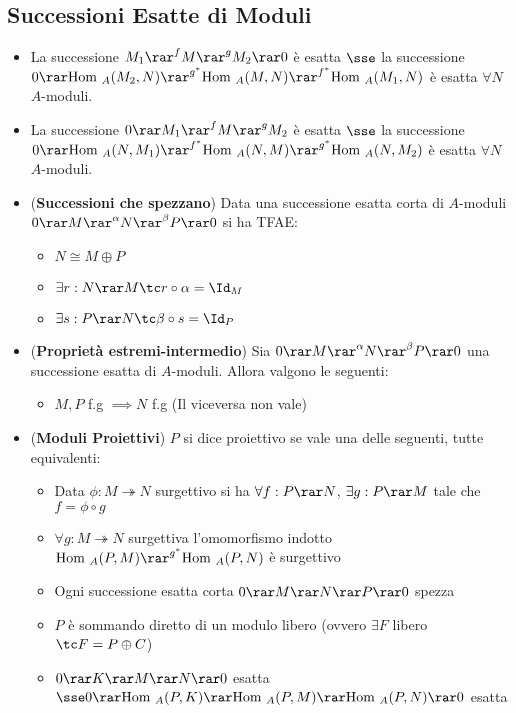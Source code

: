 \documentclass[a4paper,NoNotes,GeneralMath]{stdmdoc}
\newcommand{\srar}{\twoheadrightarrow}
\newcommand{\Hom}{\text{Hom }}
\begin{document}
	\subsection*{Successioni Esatte di Moduli}
	\begin{itemize}
		\item La successione $M_1 \rar^f M \rar^g M_2 \rar 0$ è esatta $\sse$ la successione $0 \rar \Hom_A(M_2, N) \rar^{g^*} \Hom_A(M, N) \rar^{f^*} \Hom_A(M_1, N)$ è esatta $\forall N$ $A$-moduli.
		\item La successione $0 \rar M_1 \rar^f M \rar^g M_2$ è esatta $\sse$ la successione $0 \rar \Hom_A(N, M_1) \rar^{f^*} \Hom_A(N, M) \rar^{g^*} \Hom_A(N, M_2)$ è esatta $\forall N$ $A$-moduli.
		\item ({\bf Successioni che spezzano}) Data una successione esatta corta di $A$-moduli $0 \rar M \rar^\alpha N \rar^\beta P \rar 0$ si ha TFAE:
			\begin{itemize}
				\item $N \cong M \oplus P$
				\item $\exists r: N \rar M \tc r \circ \alpha = \Id_M$
				\item $\exists s: P \rar N \tc \beta \circ s = \Id_P$
			\end{itemize}
		\item ({\bf Proprietà estremi-intermedio}) Sia $0 \rar M \rar^\alpha N \rar^\beta P \rar 0$ una successione esatta di $A$-moduli. Allora valgono le seguenti:
			\begin{itemize}
				\item $M, P$ f.g $\implies N$ f.g (Il viceversa non vale)
			\end{itemize}
		\item ({\bf Moduli Proiettivi}) $P$ si dice proiettivo se vale una delle seguenti, tutte equivalenti:
			\begin{itemize}
				\item Data $\phi: M \srar N$ surgettivo si ha $\forall f: P \rar N$, $\exists g: P \rar M$ tale che $f = \phi \circ g$
				\item $\forall g: M \srar N$ surgettiva l'omomorfismo indotto $\Hom_A(P,M) \rar^{g^*} \Hom_A(P,N)$ è surgettivo
				\item Ogni successione esatta corta $0 \rar M \rar N \rar P \rar 0$ spezza
				\item $P$ è sommando diretto di un modulo libero (ovvero $\exists F$ libero $\tc F = P \oplus C$)
				\item $0 \rar K \rar M \rar N \rar 0$ esatta $\sse 0 \rar \Hom_A(P, K) \rar \Hom_A(P, M) \rar \Hom_A(P, N) \rar 0$ esatta \\

\end{itemize}
\end{itemize}
\end{document}
